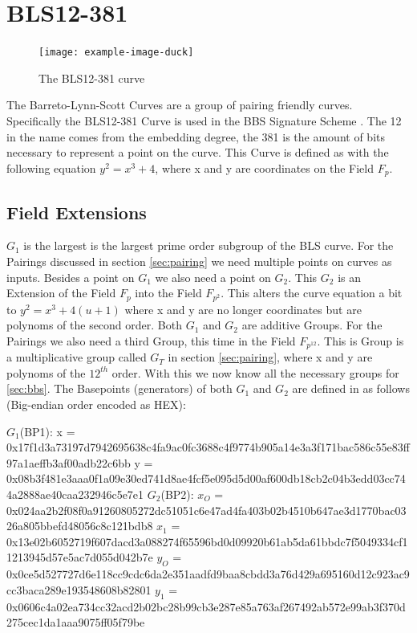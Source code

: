 \documentclass[
	a4paper               %
	,bibliography=totoc   %
	,listof=totoc         %
	,monolingual
	twoside=false,
]{bfhthesis}              %
\begin{document}
\section{BLS12-381}
\begin{figure}[h]
    \centering
	\texttt{[image: example-image-duck]}
	\caption{The BLS12-381 curve}
	\label{fig:bls12381}
\end{figure}
The Barreto-Lynn-Scott Curves \cite{pairing-friendly-curves} are a group of pairing friendly curves. 
Specifically the BLS12-381 Curve is used in the BBS Signature Scheme \cite{bbs-signature-scheme}.
The 12 in the name comes from the embedding degree, the 381 is the amount of bits necessary to represent a point on the curve.
This Curve is defined as with the following equation $y^2 = x^3 + 4$, where x and y are coordinates on the Field $F_p$.

\subsection{Field Extensions}
$G_1$ is the largest is the largest prime order subgroup of the BLS curve.
For the Pairings discussed in section \ref{sec:pairing} we need multiple points on curves as inputs.
Besides a point on $G_1$ we also need a point on $G_2$.
This $G_2$ is an Extension of the Field $F_p$ into the Field $F_{p^2}$.
This alters the curve equation a bit to $y^2 = x^3 + 4(u + 1)$ where x and y are no longer coordinates but are polynoms of the second order.
Both $G_1$ and $G_2$ are additive Groups.
For the Pairings we also need a third Group, this time in the Field $F_{p^{12}}$.
This is Group is a multiplicative group called $G_T$ in section \ref{sec:pairing}, where x and y are polynoms of the $12^{th}$ order.
With this we now know all the necessary groups for \ref{sec:bbs}.
The Basepoints (generators) of both $G_1$ and $G_2$ are defined in \cite{pairing-friendly-curves} as follows (Big-endian order encoded as HEX):\newline

\boldmath$G_1$(BP1):\newline
x = 0x17f1d3a73197d7942695638c4fa9ac0fc3688c4f9774b905a14e3a3f171bac586c55e83ff97a1aeffb3af00adb22c6bb
y = 0x08b3f481e3aaa0f1a09e30ed741d8ae4fcf5e095d5d00af600db18cb2c04b3edd03cc744a2888ae40caa232946c5e7e1\newline\newline
\boldmath$G_2$(BP2):\newline
$x_O$ = 0x024aa2b2f08f0a91260805272dc51051c6e47ad4fa403b02b4510b647ae3d1770bac0326a805bbefd48056c8c121bdb8
$x_1$ = 0x13e02b6052719f607dacd3a088274f65596bd0d09920b61ab5da61bbdc7f5049334cf11213945d57e5ac7d055d042b7e
$y_O$ = 0x0ce5d527727d6e118cc9cdc6da2e351aadfd9baa8cbdd3a76d429a695160d12c923ac9cc3baca289e193548608b82801
$y_1$ = 0x0606c4a02ea734cc32acd2b02bc28b99cb3e287e85a763af267492ab572e99ab3f370d275cec1da1aaa9075ff05f79be
\end{document}
